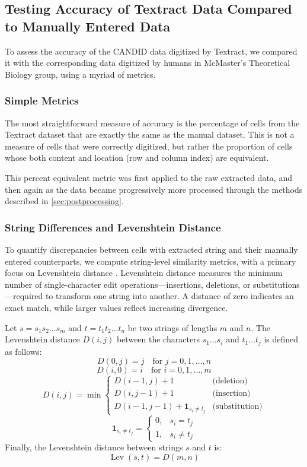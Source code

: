 \documentclass[12pt]{article}
\begin{document}
\subsection{Testing Accuracy of Textract Data Compared to Manually Entered Data}
To assess the accuracy of the CANDID data digitized by Textract, we compared it with the corresponding data digitized by humans in McMaster's Theoretical Biology group, using a myriad of metrics.

\subsubsection{Simple Metrics}
The most straightforward measure of accuracy is the percentage of cells from the Textract dataset that are exactly the same as the manual dataset. This is not a measure of cells that were correctly digitized, but rather the proportion of cells whose both content and location (row and column index) are equivalent.

This percent equivalent metric was first applied to the raw extracted data, and then again
as the data became progressively more processed through the methods described in \cref{sec:postprocessing}.

\subsubsection{String Differences and Levenshtein Distance} \label{sec:levdist}
To quantify discrepancies between cells with extracted string and their manually entered counterparts, we compute string-level similarity metrics, with a primary focus on Levenshtein distance \cite{Levenshtein1965BinaryCC}. Levenshtein distance measures the minimum number of single-character edit operations—insertions, deletions, or substitutions—required to transform one string into another. A distance of zero indicates an exact match, while larger values reflect increasing divergence.

Let $s = s_1 s_2 \dots s_m$ and $t = t_1 t_2 \dots t_n$ be two strings of lengths $m$ and $n$. The Levenshtein distance $D(i,j)$ between the characters $s_1 \dots s_i$ and $t_1 \dots t_j$ is defined as follows:
\[
D(0,j) = j \quad \text{for } j = 0,1,\dots,n
\]
\[
D(i,0) = i \quad \text{for } i = 0,1,\dots,m
\]
\[
D(i,j) =
\min \begin{cases}
D(i-1,j) + 1 & \text{(deletion)} \\
D(i,j-1) + 1 & \text{(insertion)} \\
D(i-1,j-1) + \mathbf{1}_{s_i \neq t_j} & \text{(substitution)}
\end{cases}
\]
\[
\mathbf{1}_{s_i \neq t_j} =
\begin{cases}
0, & s_i = t_j \\
1, & s_i \neq t_j
\end{cases}
\]
Finally, the Levenshtein distance between strings $s$ and $t$ is:
\[
\operatorname{Lev}(s,t) = D(m,n)
\]
\end{document}

